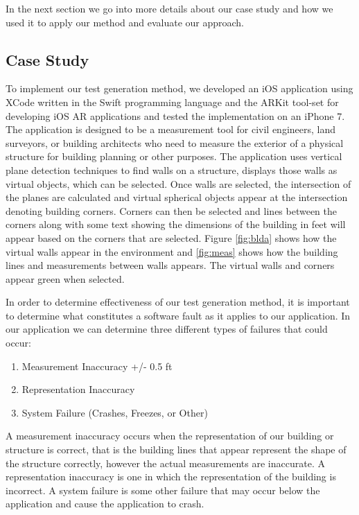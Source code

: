 \documentclass[final,3p]{CSP}
\begin{document}
In the next section we go into more details about our case study and how we used it to apply our method and evaluate our approach.

\subsection{Case Study}
\noindent

To implement our test generation method, we developed an iOS application using XCode written in the Swift programming language and the ARKit tool-set for developing iOS AR applications and tested the implementation on an iPhone 7.  The application is designed to be a measurement tool for civil engineers, land surveyors, or building architects who need to measure the exterior of a physical structure for building planning or other purposes.  The application uses vertical plane detection techniques to find walls on a structure, displays those walls as virtual objects, which can be selected.  Once walls are selected, the intersection of the planes are calculated and virtual spherical objects appear at the intersection denoting building corners.  Corners can then be selected and lines between the corners along with some text showing the dimensions of the building in feet will appear based on the corners that are selected.  Figure \ref{fig:blda} shows how the virtual walls appear in the environment and \ref{fig:meas} shows how the building lines and measurements between walls appears.  The virtual walls and corners appear green when selected.

In order to determine effectiveness of our test generation method, it is important to determine what constitutes a software fault as it applies to our application.  In our application we can determine three different types of failures that could occur:

\begin{enumerate}
    \item Measurement Inaccuracy +/- 0.5 ft
    \item Representation Inaccuracy
    \item System Failure (Crashes, Freezes, or Other)
\end{enumerate}

A measurement inaccuracy occurs when the representation of our building or structure is correct, that is the building lines that appear represent the shape of the structure correctly, however the actual measurements are inaccurate.  A representation inaccuracy is one in which the representation of the building is incorrect.  A system failure is some other failure that may occur below the application and cause the application to crash.
\end{document}
